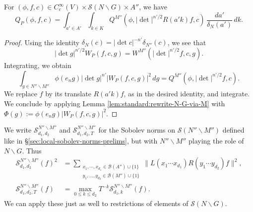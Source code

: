 \begin{lemma}\label{lem:reduce-Q-P-to-Q}
  For $(\phi, f, c) \in C_c^\infty(V) \times \mathcal{S}(N \backslash G) \times A''$, we have
  \begin{equation*}
    Q_P(\phi, f, c)
    = \int_{a ' \in A'}
    \int_{k \in K}
    Q^{M''}\left(\phi, |\det|^{n'/2 }R(a' k) f, c\right) \, \frac{d a '}{\delta_{N}(a')} \, d k.
  \end{equation*}
\end{lemma}
\begin{proof}
  Using the identity $\delta_N(c) = \lvert \det c \rvert^{- n'} \delta_{N''}(c)$, we see that
  \begin{equation*}
    |\det g|^{n'/2}
    W_P(f, c, g)
    =
    W^{M''}(|\det|^{n'/2} f,c,g).
  \end{equation*}
  Integrating, we obtain
  \begin{equation*}
    \int_{g \in N'' \backslash M''}
    \phi(e_n g)
    |\det g|^{n'}
    \left| W_P(f,c,g) \right|^2 \, d g
    =
    Q^{M''}\left(\phi, |\det|^{n'/2} f, c\right).
  \end{equation*}
  We replace $f$ by its translate $R(a' k) f$, as in the desired identity, and integrate.  We conclude by applying Lemma \ref{lem:standard:rewrite-N-G-via-M} with $\Phi(g) := \phi(e_n g) \left| W_P(f,c,g) \right|^2$.
\end{proof}

We write $\mathcal{S}_{d_1,d_2}^{N'' \backslash M''}$ and $\mathcal{S}_{d_1,d_2,T}^{N'' \backslash M''}$ for the Sobolev norms on $\mathcal{S}(N'' \backslash M'')$ defined like in \S\ref{sec:local-sobolev-norms-prelims}, but with $N'' \backslash M''$ playing the role of $N \backslash G$.  Thus
\begin{align*}
  \mathcal{S}_{d_1,d_2}^{N'' \backslash M''}(f)^2
  &=
    \sum_{
    \substack{
    x_1, \dotsb, x_{d_1} \in \mathcal{B}(A'') \cup \{1\}  \\
  y_1, \dotsc, y_{d_2 } \in \mathcal{B}(M'') \cup \{1\}
  }
  }
  \| L(x_1 \dotsb x_{d_1}) R(y_1 \dotsb y_{d_2}) f \|^2, \\
  \mathcal{S}_{d_1,d_2,T}^{N'' \backslash M''}(f)
  &=
    \max_{0 \leq k \leq d_2}
    T^{-k}
    \mathcal{S}_{d_1,k}^{N'' \backslash M''}(f).
\end{align*}
We can apply these just as well to restrictions of elements of $\mathcal{S}(N \backslash G)$.

